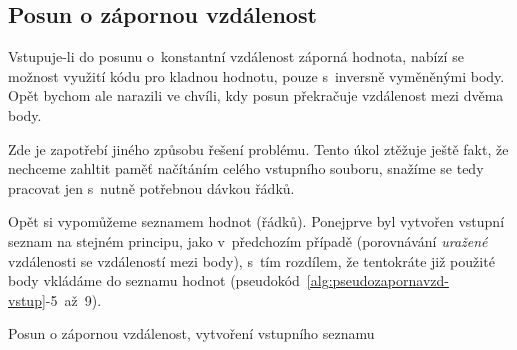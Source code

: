 \begin{algorithm}                     
\begin{algorithmic} [1]
    \ENDIF
    \ENDWHILE
    \end{algorithmic}
\end{algorithm}

\subsection{Posun o zápornou vzdálenost}
\label{zapornavzdalenost}

Vstupuje-li do posunu o~konstantní vzdálenost záporná hodnota, nabízí se možnost
využití kódu pro kladnou hodnotu, pouze s~inversně vyměněnými body. Opět bychom ale narazili
ve chvíli, kdy posun překračuje vzdálenost mezi dvěma body. 

Zde je zapotřebí jiného způsobu řešení problému. Tento úkol ztěžuje ještě fakt, že nechceme
zahltit paměť načítáním celého vstupního souboru, snažíme se tedy pracovat jen s~nutně
potřebnou dávkou řádků. 

Opět si vypomůžeme seznamem hodnot (řádků). Ponejprve byl vytvořen vstup\-ní seznam
na stejném principu, jako v~předchozím případě (porovnávání \textit{uražené} vzdálenosti se
vzdáleností mezi body), s~tím rozdílem, že tentokráte již použité body vkládáme do seznamu hodnot
(pseudokód~\ref{alg:pseudozapornavzd-vstup}-5~až~9).

\begin{algorithm}
\caption{Posun o zápornou vzdálenost, vytvoření vstupního seznamu}
\label{alg:pseudozapornavzd-vstup}
    \begin{algorithmic}[1]
    \ENDWHILE
    \end{algorithmic}
\end{algorithm}

